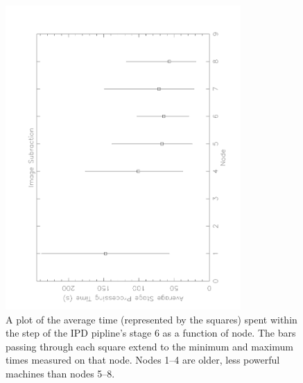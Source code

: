 \begin{figure}[htbp]
\begin{center}
\includegraphics[width=0.8\textwidth,angle=-90,scale=0.45,viewport=59 19 572 722,clip]{figures/StageProcVsNode.pdf}
\caption{A plot of the average time (represented by the squares)
  spent within the  step of the IPD pipline's stage 6
  as a function of node.  The bars passing through each square extend
  to the minimum and maximum times measured on that node.  Nodes 1--4
  are older, less powerful machines than nodes 5--8.
\label{average-node-time}} 

\vspace{0.5\baselineskip}


\end{center}
\end{figure}
